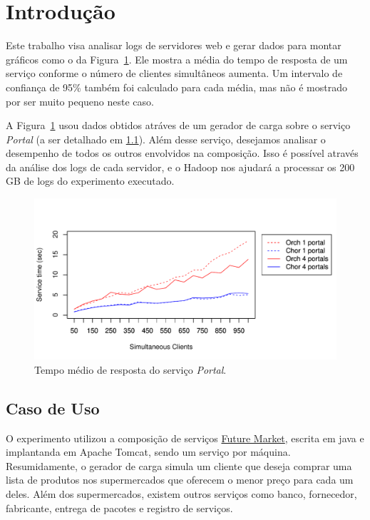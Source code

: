 \documentclass[brazil, a4paper,12pt]{article}
\begin{document}
\section{Introdução}

Este trabalho visa analisar logs de servidores web e gerar dados para montar gráficos como o da Figura~\ref{fig:portal}. Ele mostra a média do tempo de resposta de um serviço conforme o número de clientes simultâneos aumenta. Um intervalo de confiança de 95\% também foi calculado para cada média, mas não é mostrado por ser muito pequeno neste caso.

A Figura~\ref{fig:portal} usou dados obtidos atráves de um gerador de carga sobre o serviço \emph{Portal} (a ser detalhado em \ref{sec:fmarket}). Além desse serviço, desejamos analisar o desempenho de todos os outros envolvidos na composição. Isso é possível através da análise dos logs de cada servidor, e o Hadoop nos ajudará a processar os 200 GB de logs do experimento executado.

\begin{figure}[!ht]
  \begin{center}
    \includegraphics[width=\linewidth,clip=true,trim=1mm 6mm 3mm 20mm]{../talk/figures/portals1-4}
  \caption{Tempo médio de resposta do serviço \emph{Portal}.}
  \end{center}
  \label{fig:portal}
\end{figure}

\subsection{Caso de Uso}
\label{sec:fmarket}

O experimento utilizou a composição de serviços \href{http://github.com/choreos/future_market_choreography/}{Future Market}, escrita em java e implantanda em Apache Tomcat, sendo um serviço por máquina. Resumidamente, o gerador de carga simula um cliente que deseja comprar uma lista de produtos nos supermercados que oferecem o menor preço para cada um deles. Além dos supermercados, existem outros serviços como banco, fornecedor, fabricante, entrega de pacotes e registro de serviços.
\end{document}
